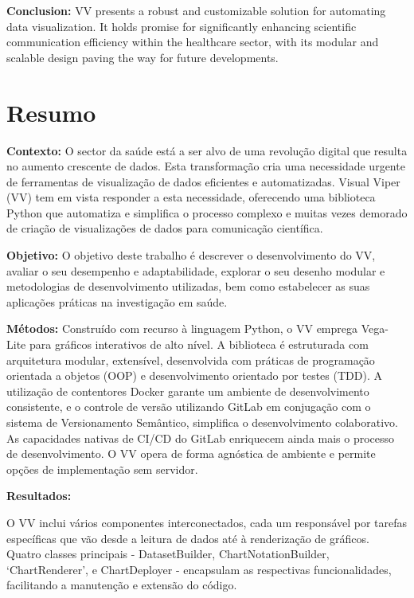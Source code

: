 \textbf{Conclusion:} VV presents a robust and customizable solution for automating data
visualization. It holds promise for significantly enhancing scientific
communication efficiency within the healthcare sector, with its modular
and scalable design paving the way for future developments.

\clearpage
\begingroup
\pagestyle{empty}\cleardoublepage
\endgroup

\chapter*{Resumo}\label{resumo}
\thispagestyle{plain}

\textbf{Contexto:} O sector da saúde está a ser alvo de uma revolução digital que resulta
no aumento crescente de dados. Esta transformação cria uma necessidade
urgente de ferramentas de visualização de dados eficientes e
automatizadas. Visual Viper (VV) tem em vista responder a esta
necessidade, oferecendo uma biblioteca Python que automatiza e
simplifica o processo complexo e muitas vezes demorado de criação de
visualizações de dados para comunicação científica.

\textbf{Objetivo:} O objetivo deste trabalho é descrever o desenvolvimento do VV, avaliar o
seu desempenho e adaptabilidade, explorar o seu desenho modular e
metodologias de desenvolvimento utilizadas, bem como estabelecer as suas
aplicações práticas na investigação em saúde.

\textbf{Métodos:} Construído com recurso à linguagem Python, o VV emprega Vega-Lite para
gráficos interativos de alto nível. A biblioteca é estruturada com
arquitetura modular, extensível, desenvolvida com práticas de
programação orientada a objetos (OOP) e desenvolvimento orientado por
testes (TDD). A utilização de contentores Docker garante um ambiente de
desenvolvimento consistente, e o controle de versão utilizando GitLab em conjugação com o sistema de Versionamento Semântico, simplifica o
desenvolvimento colaborativo. As capacidades nativas de CI/CD do GitLab
enriquecem ainda mais o processo de desenvolvimento. O VV opera de forma
agnóstica de ambiente e permite opções de implementação sem servidor.

\textbf{Resultados:}

O VV inclui vários componentes interconectados, cada um responsável por
tarefas específicas que vão desde a leitura de dados até à renderização
de gráficos. Quatro classes principais -
\textquotesingle DatasetBuilder\textquotesingle,
\textquotesingle ChartNotationBuilder\textquotesingle, `ChartRenderer',
e \textquotesingle ChartDeployer\textquotesingle{} - encapsulam as
respectivas funcionalidades, facilitando a manutenção e extensão do
código.

